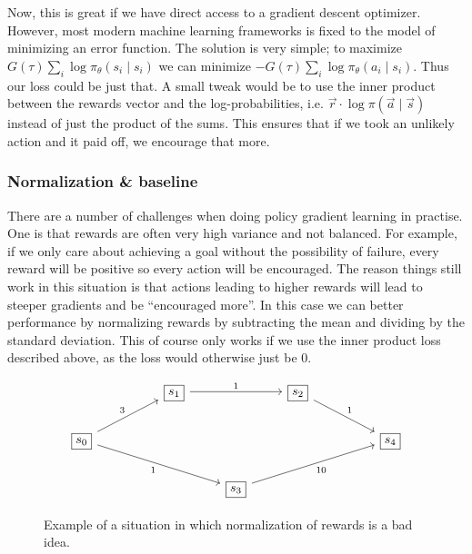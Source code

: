\documentclass{article}
\theoremstyle{changedot}
\theoremstyle{changedotbreak}
\theoremstyle{nonumberplain}
\begin{document}
Now, this is great if we have direct access to a gradient descent optimizer. However, most modern machine learning frameworks is fixed to the model of minimizing an error function. The solution is very simple; to maximize $G(\tau) \sum_{i} \log \pi_{\theta} (s_{i} \mid s_{i})$ we can minimize $-G(\tau) \sum_{i} \log \pi_{\theta} (a_{i} \mid s_{i})$. Thus our loss could be just that. A small tweak would be to use the inner product between the rewards vector and the log-probabilities, i.e. $\overrightarrow r \cdot {\log \pi(\overrightarrow a \mid \overrightarrow s)}$ instead of just the product of the sums. This ensures that if we took an unlikely action and it paid off, we encourage that more.

\subsubsection{Normalization \& baseline}
There are a number of challenges when doing policy gradient learning in practise. One is that rewards are often very high variance and not balanced. For example, if we only care about achieving a goal without the possibility of failure, every reward will be positive so every action will be encouraged. The reason things still work in this situation is that actions leading to higher rewards will lead to steeper gradients and be ``encouraged more''. In this case we can better performance by normalizing rewards by subtracting the mean and dividing by the standard deviation. This of course only works if we use the inner product loss described above, as the loss would otherwise just be 0.

\begin{figure} 
\[\begin{tikzcd}
	&& {\boxed{s_1}} && {\boxed{s_2}} \\
	{\boxed{s_0}} &&&&&& {\boxed{s_4}} \\
	&&& {\boxed{s_3}}
	\arrow["3", from=2-1, to=1-3]
	\arrow["1"', from=2-1, to=3-4]
	\arrow["1", from=1-3, to=1-5]
	\arrow["1", from=1-5, to=2-7]
	\arrow["10"', from=3-4, to=2-7]
\end{tikzcd}\]
\caption{Example of a situation in which normalization of rewards is a bad idea.}
\label{fig:bad_norm}
\end{figure}
\end{document}
